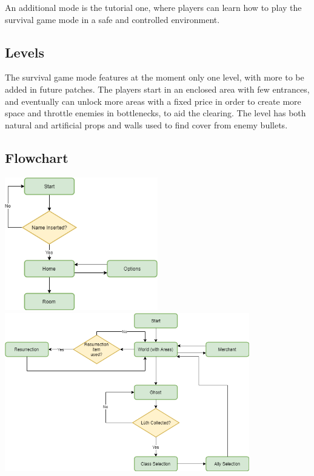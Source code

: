 \documentclass[12pt]{article}
\begin{document}
An additional mode is the tutorial one, where players can learn how to play the survival game mode in a safe and controlled environment.

\subsection{Levels}

The survival game mode features at the moment only one level, with more to be added in future patches. The players start in an enclosed area with few entrances, and eventually can unlock more areas with a fixed price in order to create more space and throttle enemies in bottlenecks, to aid the clearing. The level has both natural and artificial props and walls used to find cover from enemy bullets.

\subsection{Flowchart}

\begin{center}
	\includegraphics[width=0.5\textwidth]{Diagramma1}
	\newline\newline\newline
	\includegraphics[width=0.8\textwidth]{Diagramma2}
\end{center}
\end{document}
